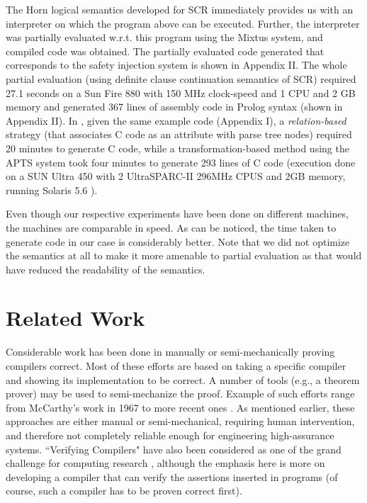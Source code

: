 \documentclass{entcs}
\begin{document}
The Horn logical semantics developed for SCR immediately provides us with
an interpreter on which the program above can be executed. Further, the
interpreter was partially evaluated w.r.t. this program using the Mixtus
system, and compiled code
was obtained. The partially evaluated code generated that
corresponds to the safety injection system is shown in Appendix II.
The whole partial evaluation (using definite clause continuation semantics of SCR)
required 27.1 seconds on a Sun Fire 880 with 150 MHz clock-speed
and 1 CPU and 2 GB memory
and generated 367 lines of assembly code in Prolog syntax (shown in Appendix II). 
In \cite{Elizabeth02}, given the same example code (Appendix I), 
a {\it relation-based} strategy (that associates C code as an attribute with
parse tree nodes) required 
20 minutes to generate C code, while
a transformation-based
method using the APTS system  \cite{apts} took four minutes to 
generate 293 lines of C code 
(execution done on a SUN Ultra 450 with 2 
UltraSPARC-II 296MHz CPUS and 2GB memory, running Solaris 5.6 \cite{Elizabeth02}).

Even though our respective experiments have been done on different machines, the machines
are comparable in speed. As can be noticed,
the time taken to generate code in our case is considerably better.
Note that we did not optimize the semantics at all to make it more amenable to partial
evaluation as that would have reduced the readability of the semantics. 

\section{Related Work}

Considerable work has been done in manually or semi-mechanically
proving compilers correct. Most of these efforts are based
on taking a specific compiler and showing its
implementation to be correct. A number of tools (e.g.,
a theorem prover) may be used to semi-mechanize the
proof. Example of such efforts range from McCarthy's work
in 1967 \cite{mccarthy} to more recent ones
\cite{borger,pfenning,sttr}.
As mentioned earlier, these approaches are either 
manual or semi-mechanical, requiring human intervention,
and therefore not completely reliable enough for engineering
high-assurance systems. ``Verifying Compilers" have also
been considered as one of the grand challenge for computing
research \cite{hoare03}, although the emphasis here is more
on developing a compiler that can verify the assertions inserted
in programs (of course, such a compiler has to be proven correct
first). 
\end{document}
